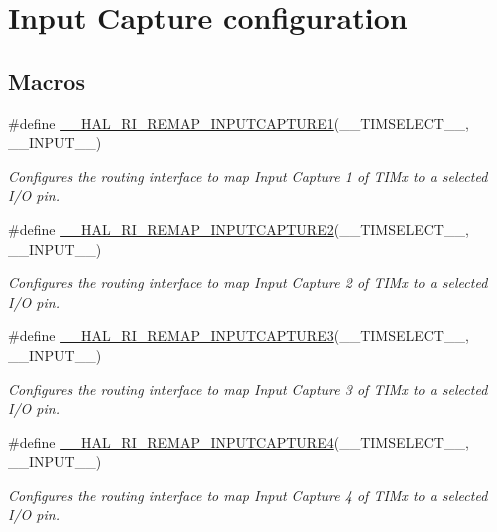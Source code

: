 \hypertarget{group___r_i___input_caputure_config}{\section{Input Capture configuration}
\label{group___r_i___input_caputure_config}
}
\subsection*{Macros}
\begin{DoxyCompactItemize}
\item 
\#define \hyperlink{group___r_i___input_caputure_config_gaab9c6ad79238b046d2c4777e4be81b85}{\-\_\-\-\_\-\-H\-A\-L\-\_\-\-R\-I\-\_\-\-R\-E\-M\-A\-P\-\_\-\-I\-N\-P\-U\-T\-C\-A\-P\-T\-U\-R\-E1}(\-\_\-\-\_\-\-T\-I\-M\-S\-E\-L\-E\-C\-T\-\_\-\-\_\-, \-\_\-\-\_\-\-I\-N\-P\-U\-T\-\_\-\-\_\-)
\begin{DoxyCompactList}\small\item\em Configures the routing interface to map Input Capture 1 of T\-I\-Mx to a selected I/\-O pin. \end{DoxyCompactList}\item 
\#define \hyperlink{group___r_i___input_caputure_config_gab8a178ab5420d9256e02063347704970}{\-\_\-\-\_\-\-H\-A\-L\-\_\-\-R\-I\-\_\-\-R\-E\-M\-A\-P\-\_\-\-I\-N\-P\-U\-T\-C\-A\-P\-T\-U\-R\-E2}(\-\_\-\-\_\-\-T\-I\-M\-S\-E\-L\-E\-C\-T\-\_\-\-\_\-, \-\_\-\-\_\-\-I\-N\-P\-U\-T\-\_\-\-\_\-)
\begin{DoxyCompactList}\small\item\em Configures the routing interface to map Input Capture 2 of T\-I\-Mx to a selected I/\-O pin. \end{DoxyCompactList}\item 
\#define \hyperlink{group___r_i___input_caputure_config_ga7505f9d5c4a5bbf3691515e8522ce5f1}{\-\_\-\-\_\-\-H\-A\-L\-\_\-\-R\-I\-\_\-\-R\-E\-M\-A\-P\-\_\-\-I\-N\-P\-U\-T\-C\-A\-P\-T\-U\-R\-E3}(\-\_\-\-\_\-\-T\-I\-M\-S\-E\-L\-E\-C\-T\-\_\-\-\_\-, \-\_\-\-\_\-\-I\-N\-P\-U\-T\-\_\-\-\_\-)
\begin{DoxyCompactList}\small\item\em Configures the routing interface to map Input Capture 3 of T\-I\-Mx to a selected I/\-O pin. \end{DoxyCompactList}\item 
\#define \hyperlink{group___r_i___input_caputure_config_ga194940d54be3e5091c3225b8f7f312c2}{\-\_\-\-\_\-\-H\-A\-L\-\_\-\-R\-I\-\_\-\-R\-E\-M\-A\-P\-\_\-\-I\-N\-P\-U\-T\-C\-A\-P\-T\-U\-R\-E4}(\-\_\-\-\_\-\-T\-I\-M\-S\-E\-L\-E\-C\-T\-\_\-\-\_\-, \-\_\-\-\_\-\-I\-N\-P\-U\-T\-\_\-\-\_\-)
\begin{DoxyCompactList}\small\item\em Configures the routing interface to map Input Capture 4 of T\-I\-Mx to a selected I/\-O pin. \end{DoxyCompactList}\end{DoxyCompactItemize}


